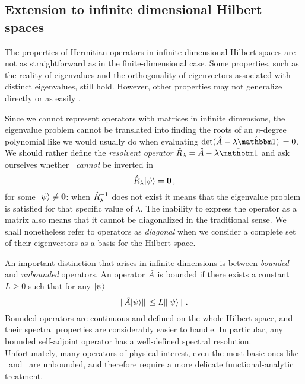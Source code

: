         \subsection{Extension to infinite dimensional Hilbert spaces}
            The properties of Hermitian operators in infinite-dimensional Hilbert spaces are not as straightforward as in the finite-dimensional case. Some properties, such as the reality of eigenvalues and the orthogonality of eigenvectors associated with distinct eigenvalues, still hold. However, other properties may not generalize directly or as easily \cite{Bernardini1993-iy}.

            Since we cannot represent operators with matrices in infinite dimensions, the eigenvalue problem cannot be translated into finding the roots of an $n$-degree polynomial like we would usually do when evaluating $\det\!\pqty*{\hA - \lambda\hidM} = 0$. We should rather define the \emph{resolvent operator} $\hRl = \hA - \lambda\hidM$ and ask ourselves whether \hRl\ \emph{cannot} be inverted in
            \begin{equation}
                \label{eq:eigenvalue-problem-infinite}
                \hat{R}_\lambda\! \ket{\psi} = \vb{0}
                \,\text{,}
            \end{equation}
            for some $\ket{\psi} \neq \vb{0}$: when $\hat{R}_\lambda^{-1}$ does not exist it means that the eigenvalue problem is satisfied for that specific value of $\lambda$. The inability to express the operator as a matrix also means that it cannot be diagonalized in the traditional sense. We shall nonetheless refer to operators as \emph{diagonal} when we consider a complete set of their eigenvectors as a basis for the Hilbert space.

            An important distinction that arises in infinite dimensions is between \emph{bounded} and \emph{unbounded} operators. An operator $\hat{A}$ is bounded if there exists a constant $L \geq 0$ such that for any $\ket{\psi}$
            \begin{equation*}  
                \norm*{\hat{A}\! \ket{\psi}} \leq L \norm*{\ket{\psi}}
                \,\text{.}
            \end{equation*}
            Bounded operators are continuous and defined on the whole Hilbert space, and their spectral properties are considerably easier to handle. In particular, any bounded self-adjoint operator has a well-defined spectral resolution. Unfortunately, many operators of physical interest, even the most basic ones like \hx\ and \hp\ are unbounded, and therefore require a more delicate functional-analytic treatment.

